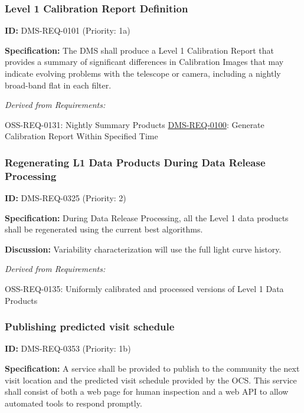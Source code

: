 \documentclass[SE,toc,lsstdraft]{lsstdoc}
\begin{document}
\subsubsection{Level 1 Calibration Report Definition}

\label{DMS-REQ-0101}
\textbf{ID:} DMS-REQ-0101 (Priority: 1a)

\textbf{Specification:} The DMS shall produce a Level 1 Calibration Report that provides a summary of significant differences in Calibration Images that may indicate evolving problems with the telescope or camera, including a nightly broad-band flat in each filter.

\emph{Derived from Requirements:}

OSS-REQ-0131:
Nightly Summary Products \newline
\hyperref[DMS-REQ-0100]{DMS-REQ-0100}:
Generate Calibration Report Within Specified Time \newline

\subsubsection{Regenerating L1 Data Products During Data Release Processing}

\label{DMS-REQ-0325}
\textbf{ID:} DMS-REQ-0325 (Priority: 2)

\textbf{Specification:} During Data Release Processing, all the Level 1 data products shall be regenerated using the current best algorithms.

\textbf{Discussion:} Variability characterization will use the full light curve history.

\emph{Derived from Requirements:}

OSS-REQ-0135:
Uniformly calibrated and processed versions of Level 1 Data Products \newline

\subsubsection{Publishing predicted visit schedule}

\label{DMS-REQ-0353}
\textbf{ID:} DMS-REQ-0353 (Priority: 1b)

\textbf{Specification:}
A service shall be provided to publish to the community the next visit location and the predicted visit schedule provided by the OCS. This service shall consist of both a web page for human inspection and a web API to allow automated tools to respond promptly.
\end{document}

